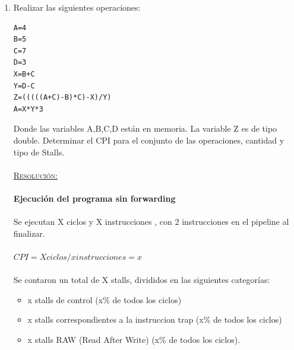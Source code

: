 \documentclass[a4paper,11pt]{article}
\begin{document}
\begin{enumerate}

\item  Realizar las siguientes operaciones:

\begin{center}
\begin{verbatim}
A=4
B=5
C=7
D=3
X=B+C
Y=D-C
Z=(((((A+C)-B)*C)-X)/Y)
A=X*Y*3
\end{verbatim}
\end{center}

Donde las variables A,B,C,D est\'an en memoria. La variable Z es de tipo double. Determinar el CPI para el conjunto de las operaciones, cantidad y tipo de Stalls.

\paragraph{}
\underline{\textsc{Resoluci\'on:}}

\paragraph{Ejecuci\'on del programa sin forwarding}


\paragraph{}
Se ejecutan X ciclos y X instrucciones , con 2 instrucciones en el  pipeline al finalizar.

\paragraph{}
\begin{center}
$CPI = X  ciclos /x instrucciones = x$
\end{center}

\paragraph{}

Se contaron un total de X stalls, divididos en las siguientes categor\'ias:

\begin{itemize}
\item x stalls de control (x\% de todos los ciclos)
\item x  stalls correspondientes a la instruccion trap (x\% de todos los ciclos)
\item x stalls RAW (Read After Write) (x\% de todos los ciclos).
\end{itemize}


\end{enumerate}
\end{document}

